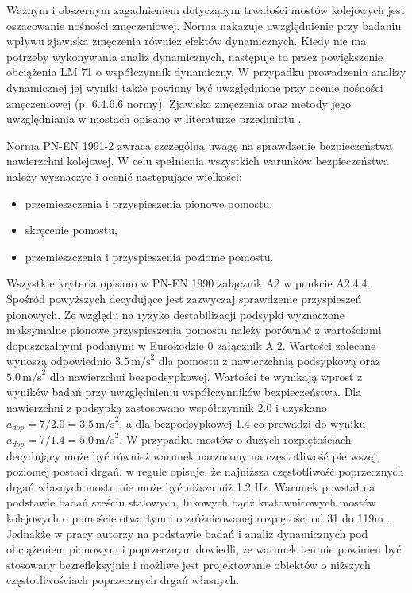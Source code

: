 Ważnym i obszernym zagadnieniem dotyczącym trwałości mostów kolejowych jest oszacowanie nośności zmęczeniowej. Norma nakazuje uwzględnienie przy badaniu wpływu zjawiska zmęczenia również efektów dynamicznych. Kiedy nie ma potrzeby wykonywania analiz dynamicznych, następuje to przez powiększenie obciążenia LM 71 o współczynnik dynamiczny. W przypadku prowadzenia analizy dynamicznej jej wyniki także powinny być uwzględnione przy ocenie nośności zmęczeniowej (p. 6.4.6.6 normy). Zjawisko zmęczenia oraz metody jego uwzględniania w mostach opisano w literaturze przedmiotu \parencite{Kocanda1985,Schijve2001,Malm2006,Siwowski2012,Siwowski2014,Szafranski2017}.


Norma PN-EN 1991-2 zwraca szczególną uwagę na sprawdzenie bezpieczeństwa nawierzchni kolejowej. W celu spełnienia wszystkich warunków bezpieczeństwa należy wyznaczyć i ocenić następujące wielkości:
\begin{itemize}
	\item przemieszczenia i przyspieszenia pionowe pomostu,
	\item skręcenie pomostu,
	\item przemieszczenia i przyspieszenia poziome pomostu.
\end{itemize}
Wszystkie kryteria opisano w PN-EN 1990 załącznik A2 w punkcie A2.4.4. Spośród powyższych decydujące jest zazwyczaj sprawdzenie przyspieszeń pionowych. Ze względu na ryzyko destabilizacji podsypki wyznaczone maksymalne pionowe przyspieszenia pomostu należy porównać z wartościami dopuszczalnymi podanymi w Eurokodzie 0 załącznik A.2. Wartości zalecane wynoszą odpowiednio $3.5\,\text{m/s}^2$ dla pomostu z nawierzchnią podsypkową oraz $5.0 \,\text{m/s}^2$ dla nawierzchni bezpodsypkowej. Wartości te wynikają wprost z wyników badań \parencite{Zacher2008} przy uwzględnieniu współczynników bezpieczeństwa. Dla nawierzchni z podsypką zastosowano współczynnik 2.0 i uzyskano $a_{dop}=7/2.0=3.5\,\text{m/s}^2$, a dla bezpodsypkowej 1.4 co prowadzi do wyniku $a_{dop}=7/1.4=5.0\,\text{m/s}^2$.
W przypadku mostów o dużych rozpiętościach decydujący może być również warunek narzucony na częstotliwość pierwszej, poziomej postaci drgań. \cite{PKNc} w regule opisuje, że najniższa częstotliwość poprzecznych drgań własnych mostu nie może być niższa niż 1.2 Hz. Warunek powstał na podstawie badań sześciu stalowych, łukowych bądź kratownicowych mostów kolejowych o pomoście otwartym i o zróżnicowanej rozpiętości od 31 do 119m \parencite{ERRI1996}. Jednakże w pracy \cite{Dias2008} autorzy na podstawie badań i analiz dynamicznych pod obciążeniem pionowym i poprzecznym dowiedli, że warunek ten nie powinien być stosowany bezrefleksyjnie i możliwe jest projektowanie obiektów o niższych częstotliwościach poprzecznych drgań własnych.

